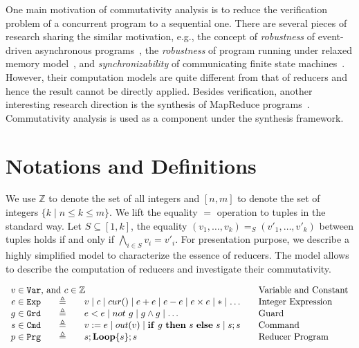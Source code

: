 \documentclass{llncs}
\newcommand{\Var}{\mathtt{Var}}
\newcommand{\Exp}{\mathtt{Exp}}
\newcommand{\Cmd}{\mathtt{Cmd}}
\newcommand{\Grd}{\mathtt{Grd}}
\newcommand{\Prg}{\mathtt{Prg}}
\newcommand{\cur}{cur()}
\newcommand{\ite}[3]{
	 \ifmmode
	 \mathbf{if}\ #1 \ \mathbf{then}\ #2\  \mathbf{else}\ #3
	 \else
	 \textbf{if}\ #1 \ \textbf{then}\ #2\  \textbf{else}\ #3
	 \fi}
\newcommand{\rloop}{
	\ifmmode
	\mathbf{Loop}
	\else
	\textbf{Loop}
	\fi}
\newcommand{\Z}{\mathbb{Z}}
\begin{document}
One main motivation of commutativity analysis is to reduce the verification problem of a concurrent program to a sequential one. There are several pieces of research sharing the similar motivation, e.g., the concept of \emph{robustness} of event-driven asynchronous programs~\cite{ahmed2017:robustness}, the \emph{robustness} of program running under relaxed memory model~\cite{ahmed2013:robustness,AbdullaACLR13,AbdullaACLR12}, and \emph{synchronizability} of communicating finite state machines~\cite{FinkelL17,basu2012synchronizability,basu2011choreography}. However, their computation models are quite different from that of reducers and hence the result cannot be directly applied. Besides verification, another interesting research direction is the synthesis of MapReduce programs~\cite{SmithA16}. Commutativity analysis is used as a component under the synthesis framework.

\section{Notations and Definitions}
\label{section:integer-reducers}
We use $\Z$ to denote the set of all integers and $[n,m]$ to denote the set of integers $\{k\mid n \leq k\leq m\}$.
We lift the equality $=$ operation to tuples in the standard way.
Let $S\subseteq [1,k]$, the equality $(v_1,\ldots,v_k)=_{S} (v'_1,\ldots,v'_k)$ between tuples holds if and only if $\bigwedge_{i\in S} v_i=v'_i$.
For presentation purpose, we describe a highly simplified model to characterize the essence of reducers. The model allows to describe the computation of reducers and investigate their commutativity.

\begin{equation*}
\begin{array}{rclcl}
\multicolumn{3}{l}{v\in \Var\mbox{, and }c \in \Z}&&\textmd{Variable and Constant}\\
e \in \Exp    &\ \ \  {\triangleq}\ \ \   & v \mid c \mid \cur \mid e + e \mid e - e \mid e \times e \mid *\mid\ldots & &\textmd{Integer Expression}\\
g\in \Grd  & {\triangleq}  & e < e \mid not\ g \mid g \wedge g  \mid \ldots& & \textmd{Guard}\\
s\in \Cmd  & {\triangleq}  & v:= e \mid out(v) \mid \ite{g}{s}{s} \mid s;s && \textmd{Command}\\
p\in \Prg  & {\triangleq}  & s;\rloop\{s\};s&& \textmd{Reducer Program}\\
\end{array}
\end{equation*}
\end{document}
